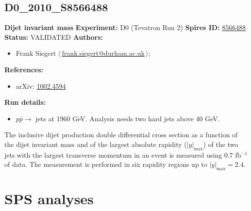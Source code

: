 \subsection[D0\_2010\_S8566488]{D0\_2010\_S8566488\,\cite{Abazov:2010fr}}
\textbf{Dijet invariant mass}\newline
\textbf{Experiment:} D0 (Tevatron Run 2) \newline
\textbf{Spires ID:} \href{http://www.slac.stanford.edu/spires/find/hep/www?rawcmd=key+8566488}{8566488}\newline
\textbf{Status:} VALIDATED\newline
\textbf{Authors:}
\begin{itemize}
  \item Frank Siegert $\langle\,$\href{mailto:frank.siegert@durham.ac.uk}{frank.siegert@durham.ac.uk}$\,\rangle$;
\end{itemize}
\textbf{References:}
\begin{itemize}
  \item arXiv: \href{http://arxiv.org/abs/1002.4594}{1002.4594}
\end{itemize}
\textbf{Run details:}
\begin{itemize}

  \item $p \bar{p} \to$ jets at 1960 GeV. Analysis needs two hard jets above 40 GeV.\end{itemize}

\noindent The inclusive dijet production double differential cross section as a function of the dijet invariant mass and of the largest absolute rapidity ($|y|_\text{max}$) of the two jets with the largest transverse momentum in an event is measured using 0.7 fb$^{-1}$ of data. The measurement is performed in six rapidity regions up to $|y|_\text{max}=2.4$.

\clearpage


\section{SPS analyses}
